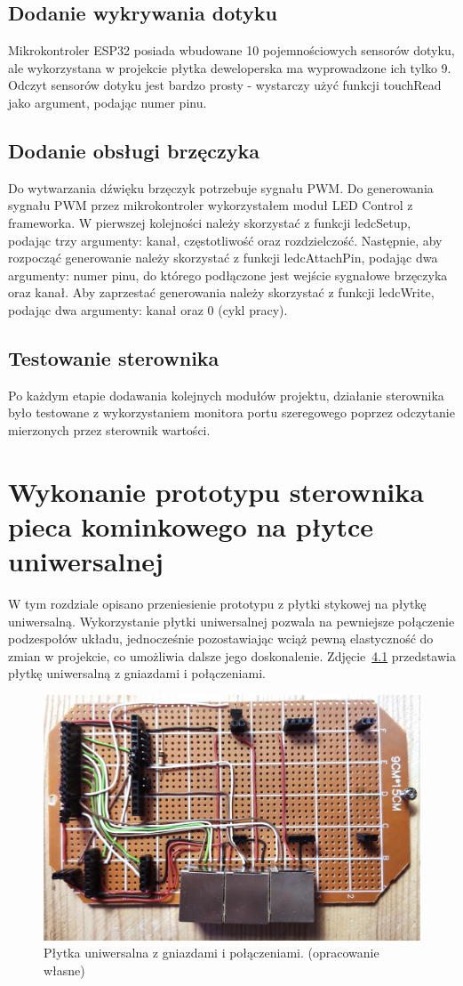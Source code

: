 \documentclass[11pt]{report}
\begin{document}
 \section{Dodanie wykrywania dotyku}
 Mikrokontroler ESP32 posiada wbudowane 10 pojemnościowych sensorów dotyku, ale wykorzystana w projekcie płytka deweloperska ma wyprowadzone ich tylko 9. Odczyt sensorów dotyku jest bardzo prosty - wystarczy użyć funkcji touchRead jako argument, podając numer pinu.
 
 \section{Dodanie obsługi brzęczyka}
 Do wytwarzania dźwięku brzęczyk potrzebuje sygnału PWM. Do generowania sygnału PWM przez mikrokontroler wykorzystałem moduł LED Control z frameworka. W pierwszej kolejności należy skorzystać z funkcji ledcSetup, podając trzy argumenty: kanał, częstotliwość oraz rozdzielczość. Następnie, aby rozpocząć generowanie należy skorzystać z funkcji ledcAttachPin, podając dwa argumenty: numer pinu, do którego podłączone jest wejście sygnałowe brzęczyka oraz kanał.
 Aby zaprzestać generowania należy skorzystać z funkcji ledcWrite, podając dwa argumenty: kanał oraz 0 (cykl pracy).
 
 \section{Testowanie sterownika}
 Po każdym etapie dodawania kolejnych modułów projektu, działanie sterownika było testowane z wykorzystaniem monitora portu szeregowego poprzez odczytanie mierzonych przez sterownik wartości.

 
 \chapter{Wykonanie prototypu sterownika pieca kominkowego na płytce uniwersalnej}\label{ch:prototyp:uniwersalna}
 W tym rozdziale opisano przeniesienie prototypu z płytki stykowej na płytkę uniwersalną.
 Wykorzystanie płytki uniwersalnej pozwala na pewniejsze połączenie podzespołów układu, jednocześnie pozostawiając wciąż pewną elastyczność do zmian w projekcie, co umożliwia dalsze jego doskonalenie.
 Zdjęcie~\ref{fig:uni_gora} przedstawia płytkę uniwersalną z gniazdami i połączeniami.
\begin{figure}[ht]
\centering
\includegraphics[width=0.8 \textwidth]{fig/plytka_gora.jpg}
\caption{Płytka uniwersalna z gniazdami i połączeniami. (opracowanie własne)}
\label{fig:uni_gora}
\end{figure}
 
\end{document}
